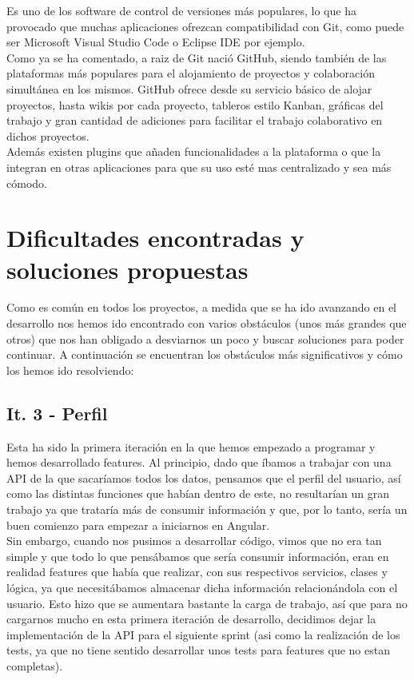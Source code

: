 Es uno de los software de control de versiones más populares, lo que ha provocado que muchas aplicaciones ofrezcan compatibilidad con Git, como puede ser Microsoft Visual Studio Code o Eclipse IDE por ejemplo.\\

Como ya se ha comentado, a raiz de Git nació GitHub, siendo también de las plataformas más populares para el alojamiento de proyectos y colaboración simultánea en los mismos. GitHub ofrece desde su servicio básico de alojar proyectos, hasta wikis por cada proyecto, tableros estilo Kanban, gráficas del trabajo y gran cantidad de adiciones para facilitar el trabajo colaborativo en dichos proyectos.\\

Además existen plugins que añaden funcionalidades a la plataforma o que la integran en otras aplicaciones para que su uso esté mas centralizado y sea más cómodo.\\

\clearpage

\section{Dificultades encontradas y soluciones propuestas}

Como es común en todos los proyectos, a medida que se ha ido avanzando en el desarrollo nos hemos ido encontrado con varios obstáculos (unos más grandes que otros) que nos han obligado a desviarnos un poco y buscar soluciones para poder continuar. A continuación se encuentran los obstáculos más significativos y cómo los hemos ido resolviendo:

\subsection{It. 3 - Perfil}

Esta ha sido la primera iteración en la que hemos empezado a programar y hemos desarrollado features. Al principio, dado que íbamos a trabajar con una API de la que sacaríamos todos los datos, pensamos que el perfil del usuario, así como las distintas funciones que habían dentro de este, no resultarían un gran trabajo ya que trataría más de consumir información y que, por lo tanto, sería un buen comienzo para empezar a iniciarnos en Angular.\\

Sin embargo, cuando nos pusimos a desarrollar código, vimos que no era tan simple y que todo lo que pensábamos que sería consumir información, eran en realidad features que había que realizar, con sus respectivos servicios, clases y lógica, ya que necesitábamos almacenar dicha información relacionándola con el usuario. Esto hizo que se aumentara bastante la carga de trabajo, así que para no cargarnos mucho en esta primera iteración de desarrollo, decidimos dejar la implementación de la API para el siguiente sprint (asi como la realización de los tests, ya que no tiene sentido desarrollar unos tests para features que no estan completas).\\

